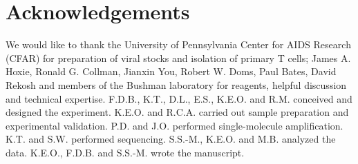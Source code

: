 \documentclass[../sherrill-Mix_thesis.tex]{subfiles}
\begin{document}
\section{Acknowledgements}
We would like to thank the University of Pennsylvania Center for AIDS Research (CFAR) for preparation of viral stocks and isolation of primary \cdFour{} T cells; James A. Hoxie, Ronald G. Collman, Jianxin You, Robert W. Doms, Paul Bates, David Rekosh and members of the Bushman laboratory for reagents, helpful discussion and technical expertise. F.D.B., K.T., D.L., E.S., K.E.O. and R.M. conceived and designed the experiment. K.E.O. and R.C.A. carried out sample preparation and experimental validation. P.D. and J.O. performed single-molecule amplification. K.T. and S.W. performed sequencing. S.S.-M., K.E.O. and M.B. analyzed the data. K.E.O., F.D.B. and S.S.-M. wrote the manuscript. 
\end{document}
